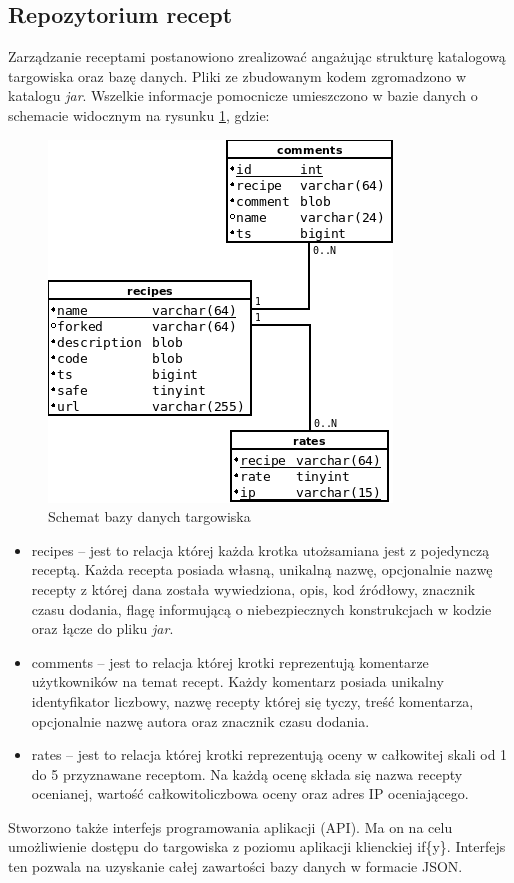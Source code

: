 \documentclass[11pt,a4paper,polish,thesis]{dcsbook}
\begin{document}
\subsection{Repozytorium recept}
Zarządzanie receptami postanowiono zrealizować angażując strukturę katalogową targowiska oraz bazę danych. Pliki ze zbudowanym kodem zgromadzono w katalogu \emph{jar}.
Wszelkie informacje pomocnicze umieszczono w bazie danych o schemacie widocznym na rysunku \ref{fig:market_db}, gdzie:
\begin{figure}[p]
  \centering
  \includegraphics[scale=0.7]{./resources/market_db.png}
  \caption{Schemat bazy danych targowiska}
  \label{fig:market_db}
\end{figure}
\begin{itemize}
\item recipes -- jest to relacja której każda krotka utożsamiana jest z pojedynczą receptą. Każda recepta posiada własną, unikalną nazwę, opcjonalnie nazwę recepty
z której dana została wywiedziona, opis, kod źródłowy, znacznik czasu dodania, flagę informującą o niebezpiecznych konstrukcjach w kodzie oraz łącze do pliku
\emph{jar}.
\item comments -- jest to relacja której krotki reprezentują komentarze użytkowników na temat recept. Każdy komentarz posiada unikalny identyfikator liczbowy, nazwę
recepty której się tyczy, treść komentarza, opcjonalnie nazwę autora oraz znacznik czasu dodania.
\item rates -- jest to relacja której krotki reprezentują oceny w całkowitej skali od 1 do 5 przyznawane receptom. Na każdą ocenę składa się nazwa recepty ocenianej,
wartość całkowitoliczbowa oceny oraz adres IP oceniającego.
\end{itemize}
Stworzono także interfejs programowania aplikacji (API). Ma on na celu umożliwienie dostępu do targowiska z poziomu aplikacji klienckiej if\{y\}. Interfejs ten
pozwala na uzyskanie całej zawartości bazy danych w formacie JSON.
\end{document}
